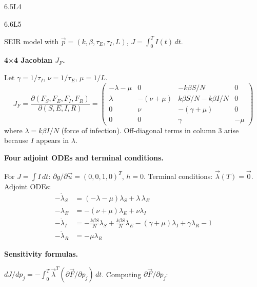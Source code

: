 \begin{solution}{6.5}{L4}

\end{solution}

\begin{solution}{6.6}{L5}

\solanswer

SEIR model with $\vec{p} = (k, \beta, \tau_E, \tau_I, L)$,
$J = \int_0^T I(t)\,dt$.

 \textbf{4$\times$4 Jacobian $J_F$.}

Let $\gamma = 1/\tau_I$, $\nu = 1/\tau_E$, $\mu = 1/L$.
\[
J_F = \frac{\partial(F_S, F_E, F_I, F_R)}{\partial(S, E, I, R)} =
\begin{pmatrix}
  -\lambda-\mu & 0 & -k\beta S/N & 0 \\
  \lambda      & -(\nu+\mu) & k\beta S/N - k\beta I/N & 0 \\
  0            & \nu & -(\gamma+\mu) & 0 \\
  0            & 0   & \gamma & -\mu
\end{pmatrix}
\]
where $\lambda = k\beta I/N$ (force of infection). Off-diagonal terms
in column 3 arise because $I$ appears in $\lambda$.

 \textbf{Four adjoint ODEs and terminal conditions.}

For $J = \int I\,dt$: $\partial g/\partial\vec{u} = (0,0,1,0)^T$, $h = 0$.
Terminal conditions: $\vec{\lambda}(T) = \vec{0}$.
Adjoint ODEs:
\begin{align*}
  -\dot{\lambda}_S &= (-\lambda-\mu)\lambda_S + \lambda\,\lambda_E \\
  -\dot{\lambda}_E &= -(\nu+\mu)\lambda_E + \nu\lambda_I \\
  -\dot{\lambda}_I &= -\frac{k\beta S}{N}\lambda_S + \frac{k\beta S}{N}\lambda_E
                       - (\gamma+\mu)\lambda_I + \gamma\lambda_R - 1 \\
  -\dot{\lambda}_R &= -\mu\lambda_R
\end{align*}

 \textbf{Sensitivity formulas.}

$dJ/dp_j = -\int_0^T \vec{\lambda}^T(\partial\vec{F}/\partial p_j)\,dt$.
Computing $\partial\vec{F}/\partial p_j$:


\end{solution}
